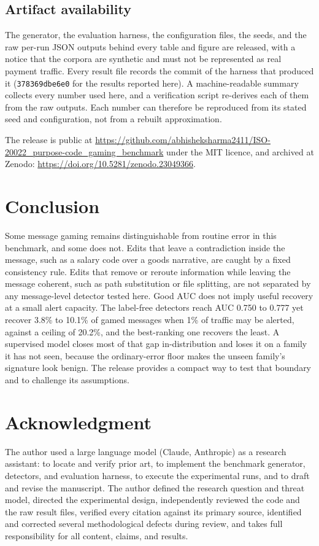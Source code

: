 \documentclass[conference]{IEEEtran}
\newif\ifanonymous
\begin{document}
\subsection{Artifact availability}
The generator, the evaluation harness, the configuration files, the seeds, and
the raw per-run JSON outputs behind every table and figure are released, with a
notice that the corpora are synthetic and must not be represented as real
payment traffic. Every result file records the commit of the harness that
produced it (\texttt{378369dbe6e0} for the results reported here). A machine-readable summary
collects every number used here, and a verification script re-derives each of
them from the raw outputs. Each number can therefore be reproduced from its
stated seed and configuration, not from a rebuilt approximation.
\ifanonymous
The release accompanies the submission and will be public on acceptance.
\else
The release is public at
\url{https://github.com/abhisheksharma2411/ISO-20022_purpose-code_gaming_benchmark}
under the MIT licence, and archived at Zenodo:
\url{https://doi.org/10.5281/zenodo.23049366}.
\fi

\section{Conclusion}
Some message gaming remains distinguishable from routine error in this
benchmark, and some does not. Edits that leave a contradiction inside the
message, such as a salary code over a goods narrative, are caught by a fixed
consistency rule. Edits that remove or reroute information while leaving the
message coherent, such as path substitution or file splitting, are not
separated by any message-level detector tested here. Good AUC does not imply
useful recovery at a small alert capacity. The label-free detectors reach
AUC 0.750 to 0.777 yet recover 3.8\% to 10.1\%
of gamed messages when 1\% of traffic may be alerted, against a ceiling of
20.2\%, and the best-ranking one recovers the least. A supervised
model closes most of that gap in-distribution and loses it on a family it has
not seen, because the ordinary-error floor makes the unseen family's
signature look benign. The release provides a compact way to test that
boundary and to challenge its assumptions.

\section*{Acknowledgment}
The author used a large language model (Claude, Anthropic) as a research
assistant: to locate and verify prior art, to implement the benchmark
generator, detectors, and evaluation harness, to execute the experimental runs,
and to draft and revise the manuscript. The author defined the research
question and threat model, directed the experimental design, independently
reviewed the code and the raw result files, verified every citation against its
primary source, identified and corrected several methodological defects during
review, and takes full responsibility for all content, claims, and results.
\end{document}

